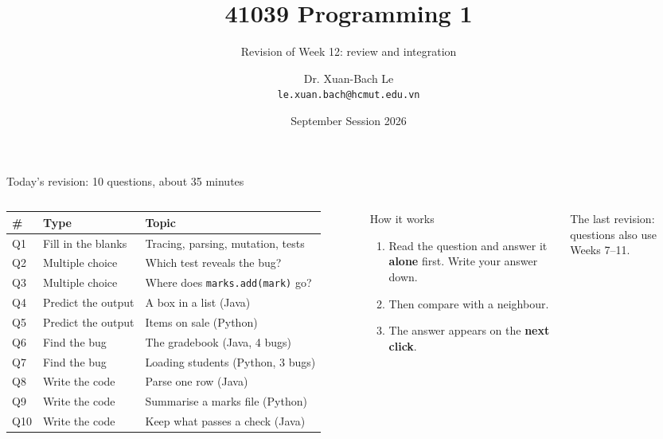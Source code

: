\documentclass[aspectratio=169]{beamer}
\title[41039 Programming 1 --- Revision of Week 12]{41039 Programming 1}
\subtitle{Revision of Week 12: review and integration}
\author{Dr. Xuan-Bach Le\\ \small\texttt{le.xuan.bach@hcmut.edu.vn}}
\institute{\small Faculty of Computer Science and Engineering, HCMUT}
\date{September Session 2026}
\newcommand{\code}[1]{\texttt{#1}}
\begin{document}
\begin{frame}[plain]
  \titlepage
\end{frame}

\begin{frame}{Today's revision: 10 questions, about 35 minutes}
  \begin{columns}[T,onlytextwidth]
    {\small
    \renewcommand{\arraystretch}{1.18}
    \begin{tabular}{@{}l@{\hspace{0.8em}}l@{\hspace{0.8em}}l@{}}
      \toprule
      \textbf{\#} & \textbf{Type} & \textbf{Topic}\\
      \midrule
      Q1  & Fill in the blanks & Tracing, parsing, mutation, tests\\
      Q2  & Multiple choice    & Which test reveals the bug?\\
      Q3  & Multiple choice    & Where does \code{marks.add(mark)} go?\\
      Q4  & Predict the output & A box in a list (Java)\\
      Q5  & Predict the output & Items on sale (Python)\\
      Q6  & Find the bug       & The gradebook (Java, 4 bugs)\\
      Q7  & Find the bug       & Loading students (Python, 3 bugs)\\
      Q8  & Write the code     & Parse one row (Java)\\
      Q9  & Write the code     & Summarise a marks file (Python)\\
      Q10 & Write the code     & Keep what passes a check (Java)\\
      \bottomrule
    \end{tabular}}
    \begin{discussionbox}{How it works}
      \small\raggedright
      \begin{enumerate}[itemsep=0.3em, topsep=0.1em, leftmargin=1.2em]
        \item Read the question and answer it \textbf{alone} first. Write your answer
              down.
        \item Then compare with a neighbour.
        \item The answer appears on the \textbf{next click}.
      \end{enumerate}
    \end{discussionbox}
    {\footnotesize The last revision: questions also use Weeks 7--11.}
  \end{columns}
\end{frame}
\end{document}

